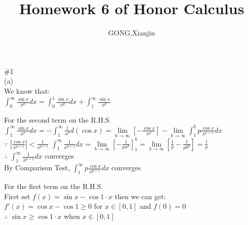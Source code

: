 \documentclass{article}
\author{GONG,Xianjin}
\title{Homework 6 of Honor Calculus}
\begin{document}
\maketitle

\vspace{3.5mm}

\textcolor[rgb]{0.00,0.00,0.50}{\#1}\\

(a)\\

We know that:\\

$\displaystyle \int_0^\infty \frac{\sin{x}}{x^p}dx = \int_0^1 \frac{\sin{x}}{x^p}dx + \int_1^\infty \frac{\sin{x}}{x^p}$\\

\vskip 1cm

For the second term on the R.H.S.\\

$\displaystyle \int_1^\infty \frac{\sin{x}}{x^p}dx = -\int_1^\infty \frac{1}{x^p}d(\cos{x}) = \lim \limits_{b \to \infty}\left[-\frac{\cos{x}}{x^p}\right] - \lim \limits_{b \to \infty} \int_1^b p\frac{\cos{x}}{x^{p+1}}dx$\\

$\because$ \qquad $\displaystyle \left|\frac{\cos{x}}{x^{p+1}}\right| < \frac{1}{x^{p+1}}$ \qquad $\displaystyle \int_1^\infty \frac{1}{x^{p+1}}dx = \lim \limits_{b \to \infty} \left[-\frac{1}{px^p}\right]_1^b = \lim \limits_{b \to \infty} \left[\frac{1}{p} - \frac{1}{pb^p}\right] = \frac{1}{p}$\\

$\therefore$ \qquad $\displaystyle \int_1^\infty \frac{1}{x^{p+1}}dx$ converges\\

By Comparison Test, \quad $\displaystyle \int_1^\infty p\frac{\cos{x}}{x^{p+1}}dx$ converges\\

\vskip 1cm

For the first term on the R.H.S.\\

First set $\displaystyle f(x) = \sin{x} - \cos{1} \cdot x$ \quad then we can get:\\

$\displaystyle f'(x) = \cos{x} - \cos{1} \geq 0$ for $x \in [0,1]$ and $f(0) = 0$\\

$\therefore$ \qquad $\sin{x} \geq \cos{1} \cdot x$ when $x \in [0,1]$\\
\end{document}
